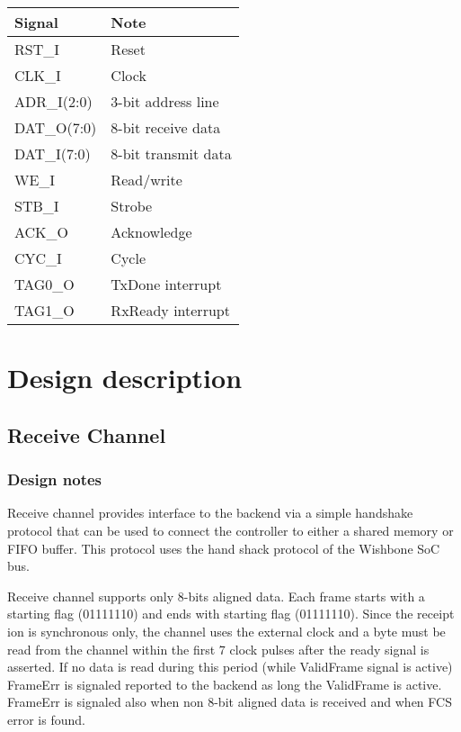 \documentclass[a4paper,11pt]{article}
\begin{document}
\begin{tabular}{|l|l|}
\hline
Signal& Note\\
\hline
\hline
RST\_I& Reset\\
CLK\_I& Clock\\
ADR\_I(2:0)& 3-bit address line\\
DAT\_O(7:0)& 8-bit receive data\\
DAT\_I(7:0)& 8-bit transmit data\\
WE\_I& Read/write\\
STB\_I& Strobe\\
ACK\_O& Acknowledge\\
CYC\_I& Cycle\\
TAG0\_O& TxDone interrupt\\
TAG1\_O& RxReady interrupt\\
\hline
\end{tabular}
 
\section{Design description}
 
 
\subsection{Receive Channel}
 
\subsubsection{Design notes}
 
Receive channel provides interface to the backend via a simple handshake protocol that can be used to connect the controller to either a shared memory or FIFO buffer. This protocol uses the hand shack protocol of the Wishbone SoC bus.
 
Receive channel supports only 8-bits aligned data. Each frame starts with a starting flag (01111110) and ends with starting flag (01111110). Since the receipt ion is synchronous only, the channel uses the external clock and a byte must be read from the channel within the first 7 clock pulses after the ready signal is asserted. If no data is read during this period (while ValidFrame signal is active) FrameErr is signaled reported to the backend as long the ValidFrame is active. FrameErr is signaled also when non 8-bit aligned data is received and when FCS error is found.
 
\end{document}
